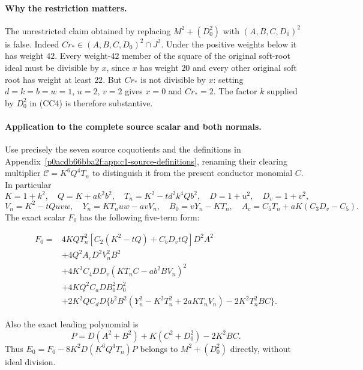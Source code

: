 \paragraph{Why the restriction matters.}
The unrestricted claim obtained by replacing $M^2+(D_0^2)$ with
$(A,B,C,D_0)^2$ is false. Indeed $Cr_*\in(A,B,C,D_0)^2\cap J^2$.
Under the positive weights below it has weight $42$. Every weight-$42$
member of the square of the original soft-root ideal must be divisible
by $x$, since $x$ has weight $20$ and every other original soft root has
weight at least $22$. But $Cr_*$ is not divisible by $x$: setting
$d=k=b=w=1$, $u=2$, $v=2$ gives $x=0$ and $Cr_*=2$.
The factor $k$ supplied by $D_0^2$ in (CC4) is therefore substantive.

\paragraph{Application to the complete source scalar and both normals.}
Use precisely the seven source coquotients and the definitions in
Appendix~\ref{p0acdb66bba2f:app:c1-source-definitions}, renaming their clearing multiplier $\mathcal C=K^6Q^4T_n$
to distinguish it from the present conductor monomial $C$. In particular
\[
 K=1+k^2,\quad Q=K+ak^2b^2,\quad T_n=K^2-td^2k^4Qb^2,
 \quad D=1+u^2,\quad D_v=1+v^2,
\]
\[
 V_n=K^2-tQuvw,\quad Y_n=KT_nuw-avV_n,
 \quad B_0=vY_n-KT_n,
 \quad A_c=C_5T_n+aK(C_3D_v-C_5).
\]
The exact scalar $F_0$ has the following five-term form:
\begin{samepage}
\begin{align*}
F_0={}&4KQT_n^2[C_2(K^2-tQ)+C_bD_vtQ]D^2A^2\\
 &+4Q^2A_cD^2V_n^2B^2\\
 &+4K^3C_4DD_v(KT_nC-ab^2BV_n)^2\\
 &+4KQ^2C_aDB_0^2D_0^2\\
 &+2K^2QC_dD\{b^2B^2(Y_n^2-K^2T_n^2+2aKT_nV_n)
                         -2K^2T_n^2BC\}.
\end{align*}
\end{samepage}
Also the exact leading polynomial is
\[
 P=D(A^2+B^2)+K(C^2+D_0^2)-2K^2BC.
\]
Thus $E_0=F_0-8K^2D(K^6Q^4T_n)P$ belongs to
$M^2+(D_0^2)$ directly, without ideal division.


